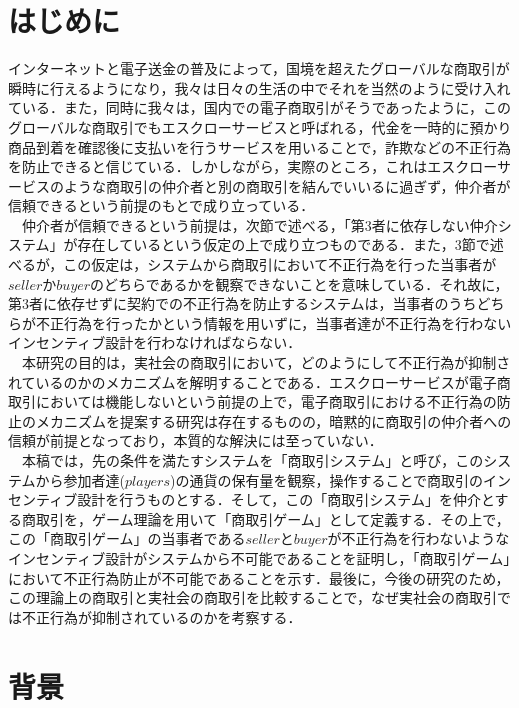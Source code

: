 \documentclass[twocolumn, a4j]{article}
\begin{document}
\section{はじめに}
インターネットと電子送金の普及によって，国境を超えたグローバルな商取引が瞬時に行えるようになり，我々は日々の生活の中でそれを当然のように受け入れている．また，同時に我々は，国内での電子商取引がそうであったように，このグローバルな商取引でもエスクローサービスと呼ばれる，代金を一時的に預かり商品到着を確認後に支払いを行うサービスを用いることで，詐欺などの不正行為を防止できると信じている．しかしながら，実際のところ，これはエスクローサービスのような商取引の仲介者と別の商取引を結んでいいるに過ぎず，仲介者が信頼できるという前提のもとで成り立っている．\\
　仲介者が信頼できるという前提は，次節で述べる，「第3者に依存しない仲介システム」が存在しているという仮定の上で成り立つものである．また，3節で述べるが，この仮定は，システムから商取引において不正行為を行った当事者が$seller$か$buyer$のどちらであるかを観察できないことを意味している．それ故に，第3者に依存せずに契約での不正行為を防止するシステムは，当事者のうちどちらが不正行為を行ったかという情報を用いずに，当事者達が不正行為を行わないインセンティブ設計を行わなければならない．\\
　本研究の目的は，実社会の商取引において，どのようにして不正行為が抑制されているのかのメカニズムを解明することである．エスクローサービスが電子商取引においては機能しないという前提の上で，電子商取引における不正行為の防止のメカニズムを提案する研究\cite{Shigeo 2000}は存在するものの，暗黙的に商取引の仲介者への信頼が前提となっており，本質的な解決には至っていない．\\
　本稿では，先の条件を満たすシステムを「商取引システム」と呼び，このシステムから参加者達($players$)の通貨の保有量を観察，操作することで商取引のインセンティブ設計を行うものとする．そして，この「商取引システム」を仲介とする商取引を，ゲーム理論を用いて「商取引ゲーム」として定義する．その上で，この「商取引ゲーム」の当事者である$seller$と$buyer$が不正行為を行わないようなインセンティブ設計がシステムから不可能であることを証明し，「商取引ゲーム」において不正行為防止が不可能であることを示す．最後に，今後の研究のため，この理論上の商取引と実社会の商取引を比較することで，なぜ実社会の商取引では不正行為が抑制されているのかを考察する．\\

\section{背景}
\end{document}
